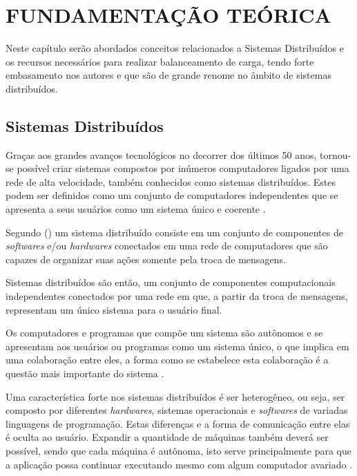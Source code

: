 \chapter{FUNDAMENTAÇÃO TEÓRICA}

Neste capítulo serão abordados conceitos relacionados a Sistemas Distribuídos e os recursos necessários para realizar balanceamento de carga, tendo forte embasamento nos autores  e  que são de grande renome no âmbito de sistemas distribuídos.

\section{Sistemas Distribuídos}

	Graças aos grandes avanços tecnológicos no decorrer dos últimos 50 anos, tornou-se possível criar sistemas compostos por inúmeros computadores ligados por uma rede de alta velocidade, também conhecidos como sistemas distribuídos. Estes podem ser definidos como um conjunto de computadores independentes que se apresenta a seus usuários como um sistema único e coerente \cite{Tanenbaum}.
	
	Segundo  (\citeyear{Coulouris-2012}) um sistema distribuído consiste em um conjunto de componentes de \textit{softwares} e/ou \textit{hardwares} conectados em uma rede de computadores que são capazes de organizar suas ações somente pela troca de mensagens.
	
	Sistemas distribuídos são então, um conjunto de componentes computacionais independentes conectados por uma rede em que, a partir da troca de mensagens, representam um único sistema para o usuário final.
	
	Os computadores e programas que compõe um sistema são autônomos e se apresentam aos usuários ou programas como um sistema único, o que implica em uma colaboração entre eles, a forma como se estabelece esta colaboração é a questão mais importante do sistema \cite{Tanenbaum}. 
	
	Uma característica forte nos sistemas distribuídos é ser heterogêneo, ou seja, ser composto por diferentes \textit{hardwares}, sistemas operacionais e \textit{softwares} de variadas linguagens de programação. Estas diferenças e a forma de comunicação entre elas é oculta ao usuário. Expandir a quantidade de máquinas também deverá ser possível, sendo que cada máquina é autônoma, isto serve principalmente para que a aplicação possa continuar executando mesmo com algum computador avariado \cite{Tanenbaum}.
	

